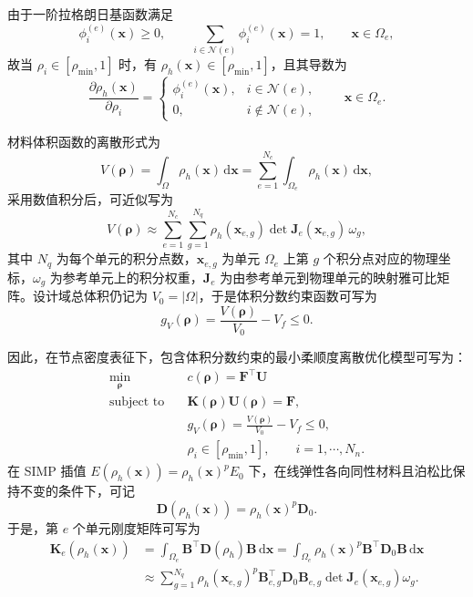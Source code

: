 由于一阶拉格朗日基函数满足
\[
\phi_i^{(e)}(\boldsymbol{x})\ge 0,\qquad \sum_{i\in\mathcal N(e)}\phi_i^{(e)}(\boldsymbol{x})=1, \qquad \boldsymbol{x}\in\Omega_e,
\]
故当 $\rho_i\in[\rho_{\min},1]$ 时，有 $\rho_h(\boldsymbol{x})\in[\rho_{\min},1]$，且其导数为
\[
\frac{\partial \rho_h(\boldsymbol{x})}{\partial \rho_i} = \begin{cases} \phi_i^{(e)}(\boldsymbol{x}), & i\in\mathcal N(e),\\[4pt] 0, & i\notin\mathcal N(e), \end{cases} \qquad \boldsymbol{x}\in\Omega_e.
\]

材料体积函数的离散形式为
\[
V(\boldsymbol{\rho}) = \int_{\Omega}\rho_h(\boldsymbol{x})\,\mathrm d\boldsymbol{x} = \sum_{e=1}^{N_c}\int_{\Omega_e}\rho_h(\boldsymbol{x})\,\mathrm d\boldsymbol{x},
\]
采用数值积分后，可近似写为
\[
V(\boldsymbol{\rho}) \approx \sum_{e=1}^{N_c}\sum_{g=1}^{N_q} \rho_h(\boldsymbol{x}_{e,g}) \det\boldsymbol J_e(\boldsymbol{x}_{e,g})\,\omega_g,
\]
其中 $N_q$ 为每个单元的积分点数，$\boldsymbol{x}_{e,g}$ 为单元 $\Omega_e$ 上第 $g$ 个积分点对应的物理坐标，$\omega_g$ 为参考单元上的积分权重，$\boldsymbol J_e$ 为由参考单元到物理单元的映射雅可比矩阵。设计域总体积仍记为 $V_0=|\Omega|$，于是体积分数约束函数可写为
\[
g_V(\boldsymbol{\rho}) = \frac{V(\boldsymbol{\rho})}{V_0}-V_f\le 0.
\]

因此，在节点密度表征下，包含体积分数约束的最小柔顺度离散优化模型可写为：
\begin{equation} \label{eq:ch3_discrete_model_node}
	\begin{aligned} 
		\min_{\boldsymbol{\rho}}\quad & c(\boldsymbol{\rho}) = \boldsymbol{F}^{\top}\boldsymbol{U}\\ 
		\text{subject to}\quad & \boldsymbol{K}(\boldsymbol\rho)\boldsymbol{U}(\boldsymbol\rho)=\boldsymbol{F},\\ 
		& g_V(\boldsymbol\rho)=\frac{V(\boldsymbol\rho)}{V_0}-V_f\le 0,\\ 
		& \rho_i\in[\rho_{\min},1],\qquad i=1,\cdots,N_n. 
	\end{aligned}
\end{equation}
在 SIMP 插值 $E(\rho_h(\boldsymbol{x}))=\rho_h(\boldsymbol{x})^pE_0$ 下，在线弹性各向同性材料且泊松比保持不变的条件下，可记
\[
\boldsymbol D(\rho_h(\boldsymbol{x})) = \rho_h(\boldsymbol{x})^p\boldsymbol D_0.
\]
于是，第 $e$ 个单元刚度矩阵可写为
\[
\begin{aligned}
	\boldsymbol{K}_e(\rho_h(\boldsymbol{x})) 
	&= \int_{\Omega_e}\boldsymbol{B}^{\top}\boldsymbol{D}(\rho_h)\boldsymbol{B}\,\mathrm{d}\boldsymbol{x} = \int_{\Omega_e}\rho_h(\boldsymbol x)^p\boldsymbol B^{\top}\boldsymbol D_0\boldsymbol B\,\mathrm d\boldsymbol x\\
	&\approx \sum_{g=1}^{N_q}\rho_h(\boldsymbol{x}_{e,g})^p\boldsymbol{B}_{e,g}^{\top}\boldsymbol{D}_0\boldsymbol{B}_{e,g}\det\boldsymbol{J}_e(\boldsymbol{x}_{e,g})\omega_g.
\end{aligned}
\]

